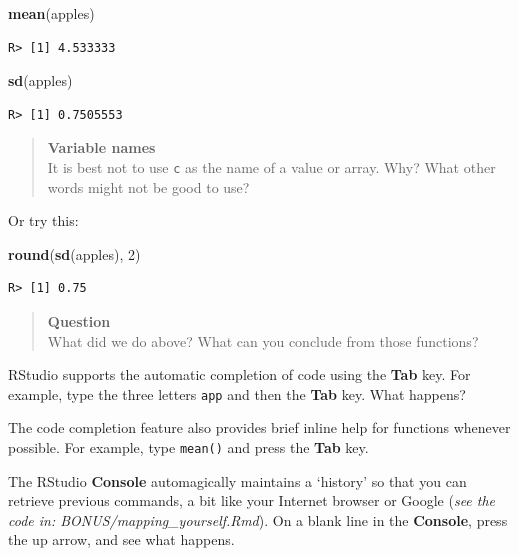\documentclass[
]{book}
\newenvironment{Shaded}{\begin{snugshade}}{\end{snugshade}}
\newcommand{\DecValTok}[1]{\textcolor[rgb]{0.00,0.00,0.81}{#1}}
\newcommand{\KeywordTok}[1]{\textcolor[rgb]{0.13,0.29,0.53}{\textbf{#1}}}
\newcommand{\NormalTok}[1]{#1}
\begin{document}
\begin{Shaded}
\begin{Highlighting}[]
\KeywordTok{mean}\NormalTok{(apples)}
\end{Highlighting}
\end{Shaded}

\begin{verbatim}
R> [1] 4.533333
\end{verbatim}

\begin{Shaded}
\begin{Highlighting}[]
\KeywordTok{sd}\NormalTok{(apples)}
\end{Highlighting}
\end{Shaded}

\begin{verbatim}
R> [1] 0.7505553
\end{verbatim}

\begin{quote}
\textbf{Variable names}\\
It is best not to use \texttt{c} as the name of a value or array. Why? What other words might not be good to use?
\end{quote}

Or try this:

\begin{Shaded}
\begin{Highlighting}[]
\KeywordTok{round}\NormalTok{(}\KeywordTok{sd}\NormalTok{(apples), }\DecValTok{2}\NormalTok{)}
\end{Highlighting}
\end{Shaded}

\begin{verbatim}
R> [1] 0.75
\end{verbatim}

\begin{quote}
\textbf{Question}\\
What did we do above? What can you conclude from those functions?
\end{quote}

RStudio supports the automatic completion of code using the \textbf{Tab} key. For example, type the three letters \texttt{app} and then the \textbf{Tab} key. What happens?

The code completion feature also provides brief inline help for functions whenever possible. For example, type \texttt{mean()} and press the \textbf{Tab} key.

The RStudio \textbf{Console} automagically maintains a `history' so that you can retrieve previous commands, a bit like your Internet browser or Google (\emph{see the code in: BONUS/mapping\_yourself.Rmd}). On a blank line in the \textbf{Console}, press the up arrow, and see what happens.
\end{document}

